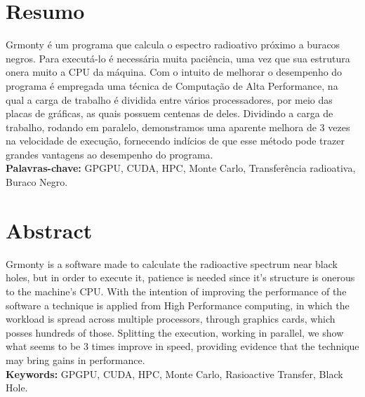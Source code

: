 \documentclass[12pt,twoside,a4paper]{book}
\begin{document}


\chapter*{Resumo}
  Grmonty é um programa que calcula o espectro radioativo próximo a buracos negros. Para executá-lo é necessária muita paciência, uma vez que sua estrutura onera muito a CPU da máquina. Com o intuito de melhorar o desempenho do programa é empregada uma técnica de Computação de Alta Performance, na qual a carga de trabalho é dividida entre vários processadores, por meio das placas de gráficas, as quais possuem centenas de deles. Dividindo a carga de trabalho, rodando em paralelo, demonstramos uma aparente melhora de 3 vezes na velocidade de execução, fornecendo indícios de que esse método pode trazer grandes vantagens ao desempenho do programa.
\\

\noindent \textbf{Palavras-chave:} GPGPU, CUDA, HPC, Monte Carlo, Transferência radioativa, Buraco Negro.

\chapter*{Abstract}
  Grmonty is a software made to calculate the radioactive spectrum near black holes, but in order to execute it, patience is needed since it's structure is onerous to the machine's CPU. With the intention of improving the performance of the software a technique is applied from High Performance computing, in which the workload is spread across multiple processors, through graphics cards, which posses hundreds of those. Splitting the execution, working in parallel, we show what seems to be 3 times improve in speed, providing evidence that the technique may bring gains in performance.
\\

\noindent \textbf{Keywords:} GPGPU, CUDA, HPC, Monte Carlo, Rasioactive Transfer, Black Hole.


\tableofcontents

\end{document}
